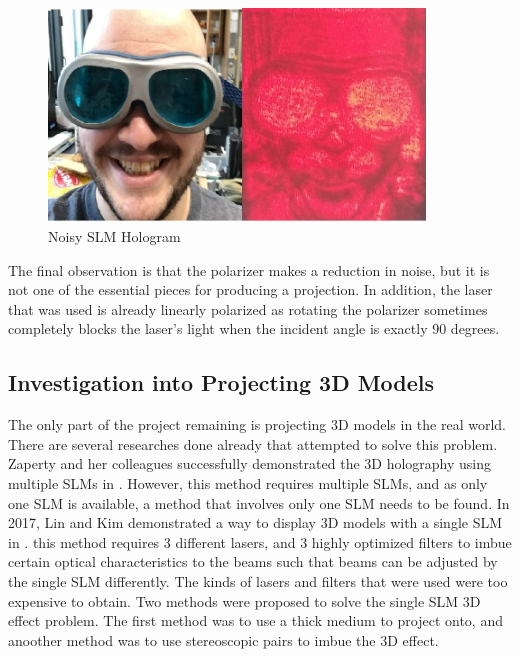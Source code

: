 \documentclass[12pt]{article}
\begin{document}
\begin{figure}
    \centering
    \includegraphics[width=100mm]{noisy_hologram.jpg}
    \caption{Noisy SLM Hologram}
    \label{fig:Ben}
\end{figure}

The final observation is that the polarizer makes a reduction in noise, but it is not one of the essential pieces for producing a projection. In addition, the laser that was used is already linearly polarized as rotating the polarizer sometimes completely blocks the laser's light when the incident angle is exactly 90 degrees.

\subsection{Investigation into Projecting 3D Models}
The only part of the project remaining is projecting 3D models in the real world. There are several researches done already that attempted to solve this problem. Zaperty and her colleagues successfully demonstrated the 3D holography using multiple SLMs in \cite{Zaperty:17}. However, this method requires multiple SLMs, and as only one SLM is available, a method that involves only one SLM needs to be found. In 2017, Lin and Kim demonstrated a way to display 3D models with a single SLM in \cite{lin2017single}. this method requires 3 different lasers, and 3 highly optimized filters to imbue certain optical characteristics to the beams such that beams can be adjusted by the single SLM differently. The kinds of lasers and filters that were used were too expensive to obtain. Two methods were proposed to solve the single SLM 3D effect problem. The first method was to use a thick medium to project onto, and anoother method was to use stereoscopic pairs to imbue the 3D effect.
\end{document}
